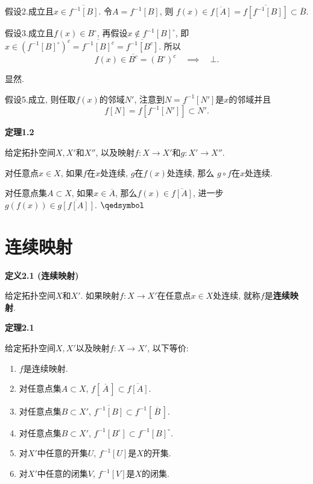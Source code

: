 
假设2.成立且$x\in\overline{f^{-1}[B]}$. 令$A=f^{-1}[B]$, 则
$f(x)\in\overline{f[A]}=\overline{f[f^{-1}[B]]}\subset\overline{B}$.


假设3.成立且$f(x)\in B^\circ$, 再假设$x\notin f^{-1}[B]^\circ$,
即$x\in(f^{-1}[B]^\circ)^c=\overline{f^{-1}[B]^c}=\overline{f^{-1}[B^c]}$. 所以
\[
    f(x)\in\overline{B^c}=(B^\circ)^c\quad\implies\quad\bot.
\]

 显然.


假设5.成立, 则任取$f(x)$的邻域$N'$, 注意到$N=f^{-1}[N']$是$x$的邻域并且
\begin{equation*}
    f[N]=f[f^{-1}[N']]\subset N'.
\tag*{\qedsymbol}\end{equation*}

\vspace{10pt}

\hypertarget{sec:定理1.2}{}
\noindent\textbf{定理1.2}

给定拓扑空间$X,X'$和$X''$, 以及映射$f:X\to X'$和$g:X'\to X''$.

对任意点$x\in X$, 如果$f$在$x$处连续, $g$在$f(x)$处连续, 那么
$g\circ f$在$x$处连续.


对任意点集$A\subset X$, 如果$x\in\overline{A}$,
那么$f(x)\in\overline{f[A]}$, 进一步$g(f(x))\in\overline{g[f[A]]}$.
\hfill $\qedsymbol$





\newpage

\section{连续映射}

\hypertarget{sec:定义2.1}{}
\noindent\textbf{定义2.1 (连续映射)}

给定拓扑空间$X$和$X'$.
如果映射$f:X\to X'$在任意点$x\in X$处连续, 就称$f$是\textbf{连续映射}.

\vspace{10pt}

\hypertarget{sec:定理2.1}{}
\noindent\textbf{定理2.1}

给定拓扑空间$X,X'$以及映射$f:X\to X'$, 以下等价:
\begin{enumerate}
    \item $f$是连续映射.
    \item 对任意点集$A\subset X$, $f[\,\overline{A}\,]\subset\overline{f[A]}$.
    \item 对任意点集$B\subset X'$,
    $\overline{f^{-1}[B]}\subset f^{-1}[\,\overline{B}\,]$.
    \item 对任意点集$B\subset X'$,
    $f^{-1}[B^\circ]\subset f^{-1}[B]^\circ$.
    \item 对$X'$中任意的开集$U$, $f^{-1}[U]$是$X$的开集.
    \item 对$X'$中任意的闭集$V$, $f^{-1}[V]$是$X$的闭集.
\end{enumerate}

